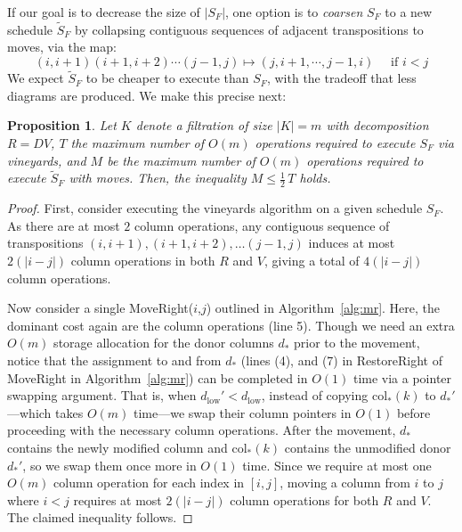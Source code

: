 \documentclass[sn-mathphys]{sn-jnl}
\newtheorem{proposition}{Proposition}
\begin{document}
If our goal is to decrease the size of $\lvert S_F \rvert$, one option is to \emph{coarsen} $S_F$ to a new schedule $\widetilde{S}_F$ by collapsing contiguous sequences of adjacent transpositions to moves, via the map:
\begin{equation}\label{eq:tr_to_mv}
	 (i, i+1)(i+1, i+2)\cdots(j-1, j) \mapsto (j, i+1, \cdots, j-1, i)  \quad \text{ if } i < j
\end{equation}
We expect $\widetilde{S}_F$ to be cheaper to execute than $S_F$, with the tradeoff  that less diagrams are produced.
We make this precise next:
\begin{proposition}\label{prop:factor2}
	Let $K$ denote a filtration of size $\lvert K \rvert = m$ with decomposition $R = D V$, $T$ the maximum number of $O(m)$ operations required to execute $S_F$ via vineyards, and $M$ be the maximum number of $O(m)$ operations required to execute $\widetilde{S}_F$ with moves. Then, the inequality $ M \leq {\textstyle \frac{1}{2} \, T}$ holds.
\end{proposition}
\begin{proof} \normalsize
First, consider executing the vineyards algorithm on a given schedule $S_F$. As there are at most $2$ column operations, any contiguous sequence of transpositions $(i,i+1), (i+1,i+2), \ldots (j-1,j)$ induces at most $2(\lvert i - j \rvert)$ column operations in both $R$ and $V$, giving a total of $4(\lvert i - j \rvert)$ column operations.

Now consider a single MoveRight($i$,$j$) outlined in Algorithm~\ref{alg:mr}. Here, the dominant cost again are the column operations (line 5). 
Though we need an extra $O(m)$ storage allocation for the donor columns $d_\ast$ prior to the movement, notice that the assignment to and from $d_\ast$ (lines (4), and (7) in RestoreRight of MoveRight in Algorithm~\ref{alg:mr}) can be completed in $O(1)$ time via a pointer swapping argument. That is, when $d_\mathrm{low}' < d_\mathrm{low}$, instead of copying $\mathrm{col}_\ast(k)$ to $d_\ast'$---which takes $O(m)$ time---we swap their column pointers in $O(1)$ before proceeding with the necessary column operations. After the movement, $d_\ast$ contains the newly modified column and $\mathrm{col}_\ast(k)$ contains the unmodified donor $d_\ast'$, so we swap them once more in $O(1)$ time. 
Since we require at most one $O(m)$ column operation for each index in $[i, j]$, moving a column from $i$ to $j$ where $i < j$ requires at most $2(\lvert i - j \rvert)$ column operations for both $R$ and $V$. The claimed inequality follows. 
\end{proof}
\end{document}
